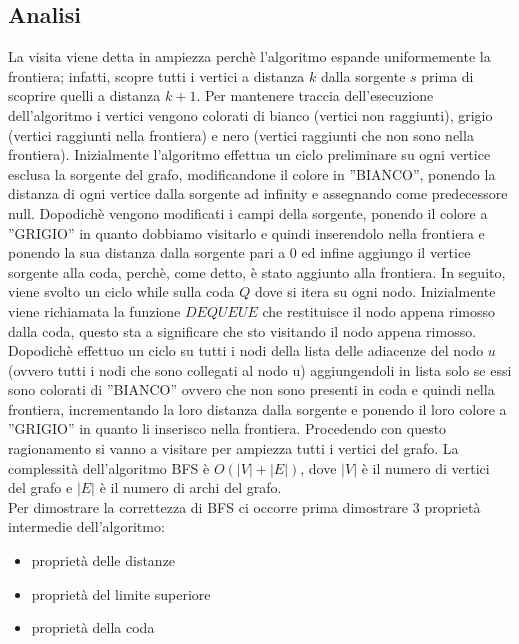 \subsection{Analisi}
La visita viene detta in ampiezza perchè l’algoritmo espande uniformemente la frontiera; infatti,
scopre tutti i vertici a distanza $k$ dalla sorgente $s$ prima di scoprire quelli a distanza $k+1$. Per
mantenere traccia dell’esecuzione dell’algoritmo i vertici vengono colorati di bianco (vertici
non raggiunti), grigio (vertici raggiunti nella frontiera) e nero (vertici raggiunti che non sono
nella frontiera). Inizialmente l’algoritmo effettua un ciclo preliminare su ogni vertice esclusa la
sorgente del grafo, modificandone il colore in ”BIANCO”, ponendo la distanza di ogni vertice
dalla sorgente ad infinity e assegnando come predecessore null. Dopodichè vengono modificati
i campi della sorgente, ponendo il colore a ”GRIGIO” in quanto dobbiamo visitarlo e quindi
inserendolo nella frontiera e ponendo la sua distanza dalla sorgente pari a 0 ed infine aggiungo il
vertice sorgente alla coda, perchè, come detto, è stato aggiunto alla frontiera. In seguito, viene
svolto un ciclo while sulla coda $Q$ dove si itera su ogni nodo. Inizialmente viene richiamata la
funzione $DEQUEUE$ che restituisce il nodo appena rimosso dalla coda, questo sta a significare
che sto visitando il nodo appena rimosso. Dopodichè effettuo un ciclo su tutti i nodi della lista
delle adiacenze del nodo $u$ (ovvero tutti i nodi che sono collegati al nodo u) aggiungendoli in
lista solo se essi sono colorati di ”BIANCO” ovvero che non sono presenti in coda e quindi nella
frontiera, incrementando la loro distanza dalla sorgente e ponendo il loro colore a ”GRIGIO”
in quanto li inserisco nella frontiera. Procedendo con questo ragionamento si vanno a visitare
per ampiezza tutti i vertici del grafo. La complessità dell’algoritmo BFS è $O(|V|+ |E|)$, dove
$|V|$ è il numero di vertici del grafo e $|E|$ è il numero di archi del grafo.\bigskip\\
\noindent Per dimostrare la correttezza di BFS ci occorre prima dimostrare $3$ proprietà intermedie dell'algoritmo:
\begin{itemize}
    \item proprietà delle distanze
    \item proprietà del limite superiore
    \item proprietà della coda
\end{itemize} 
